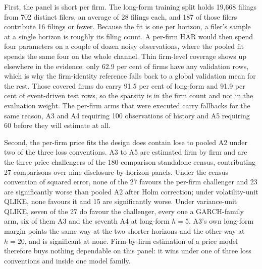 First, the panel is short per firm. The long-form training split holds 19{,}668
filings from 702 distinct filers, an average of 28 filings each, and 187 of those
filers contribute 16 filings or fewer. %
Because the fit is one per horizon, a filer's sample at a single horizon is
roughly its filing count. A per-firm HAR would then spend four parameters on a
couple of dozen noisy observations, where the pooled fit spends the same four on
the whole channel. Thin firm-level coverage shows up elsewhere in the evidence:
only 62.9 per cent of firms have any validation rows, which is why the
firm-identity reference falls back to a global validation mean for the rest. Those
covered firms do carry 91.5 per cent of long-form and 91.9 per cent of
event-driven test rows, so the sparsity is in the firm count and not in the
evaluation weight. %
The per-firm arms that were executed carry fallbacks for the same reason, A3 and
A4 requiring 100 observations of history and A5 requiring 60 before they will
estimate at all. %

Second, the per-firm price fits the design does contain lose to pooled A2 under
two of the three loss conventions. A3 to A5 are estimated firm by firm and are the
three price challengers of the 180-comparison standalone census, contributing 27
comparisons over nine disclosure-by-horizon panels. Under the census convention of squared error, none
of the 27 favours the per-firm challenger and 23 are significantly worse than
pooled A2 after Holm correction; under volatility-unit QLIKE, none favours it and
15 are significantly worse. %
Under variance-unit QLIKE, seven of the 27 do favour the challenger, every one a
GARCH-family arm, six of them A3 and the seventh A4 at long-form $h=5$. A3's
own long-form margin points the same way at the two shorter horizons and the
other way at $h{=}20$, and is significant at none. %
Firm-by-firm estimation of a price model therefore buys nothing dependable on
this panel: it wins under one of three loss conventions and inside one model
family.


